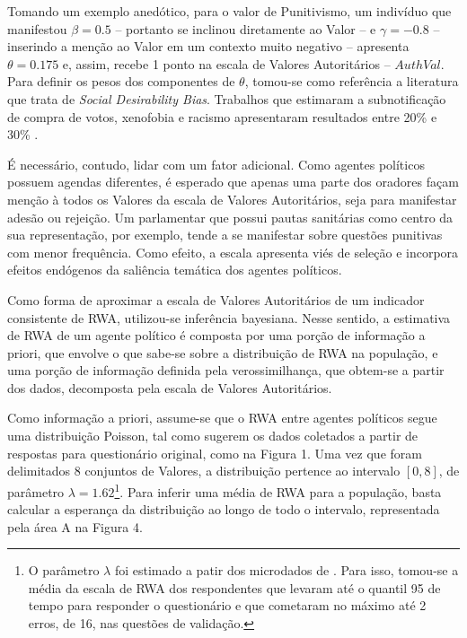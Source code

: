 \documentclass[
12pt,				%
openright,			%
twoside,			%
a4paper,			%
english,			%
french,				%
spanish,			%
brazil				%
]{abntex2}
\begin{document}
Tomando um exemplo anedótico, para o valor de Punitivismo, um indivíduo que manifestou $\beta = 0.5$ -- portanto se inclinou diretamente ao Valor -- e $\gamma = -0.8$ -- inserindo a menção ao Valor em um contexto muito negativo -- apresenta $\theta = 0.175$ e, assim, recebe 1 ponto na escala de Valores Autoritários -- $AuthVal$. Para definir os pesos dos componentes de $\theta$, tomou-se como referência a literatura que trata de \emph{Social Desirability Bias}. Trabalhos que estimaram a subnotificação de compra de votos, xenofobia e racismo apresentaram resultados entre 20{\%} e 30{\%} \cite{rudmin1999norwegian,heerwig2009education,gonzalez2012vote}.

É necessário, contudo, lidar com um fator adicional. Como agentes políticos possuem agendas diferentes, é esperado que apenas uma parte dos oradores façam menção à todos os Valores da escala de Valores Autoritários, seja para manifestar adesão ou rejeição. Um parlamentar que possui pautas sanitárias como centro da sua representação, por exemplo, tende a se manifestar sobre questões punitivas com menor frequência. Como efeito, a escala apresenta viés de seleção e incorpora efeitos endógenos da saliência temática dos agentes políticos.

Como forma de aproximar a escala de Valores Autoritários de um indicador consistente de RWA, utilizou-se inferência bayesiana. Nesse sentido, a estimativa de RWA de um agente político é composta por uma porção de informação a priori, que envolve o que sabe-se sobre a distribuição de RWA na população, e uma porção de informação definida pela verossimilhança, que obtem-se a partir dos dados, decomposta pela escala de Valores Autoritários. 

Como informação a priori, assume-se que o RWA entre agentes políticos segue uma distribuição Poisson, tal como sugerem os dados coletados a partir de respostas para questionário original, como na Figura 1. Uma vez que foram delimitados 8 conjuntos de Valores, a distribuição pertence ao intervalo $[0, 8]$, de parâmetro $\lambda = 1.62$\footnote{O parâmetro $\lambda$ foi estimado a patir dos microdados de . Para isso, tomou-se a média da escala de RWA dos respondentes que levaram até o quantil 95 de tempo para responder o questionário e que cometaram no máximo até 2 erros, de 16, nas questões de validação.}. Para inferir uma média de RWA para a população, basta calcular a esperança da distribuição ao longo de todo o intervalo, representada pela área A na Figura 4.
\end{document}
